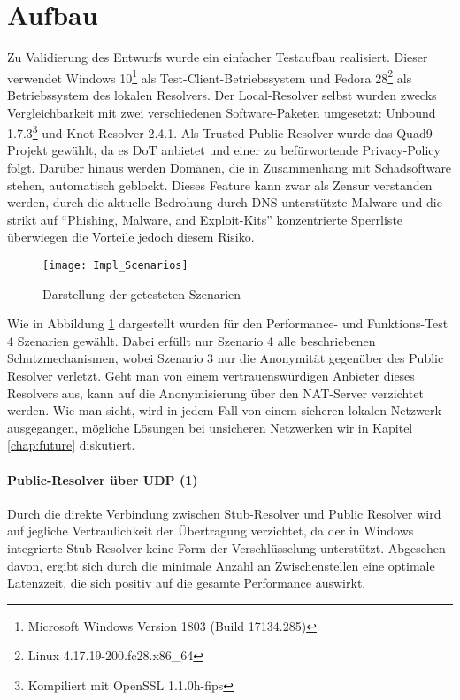 \section{Aufbau}
\label{sec:architecture}
Zu Validierung des Entwurfs wurde ein einfacher Testaufbau realisiert. Dieser verwendet Windows 10\footnote{Microsoft Windows Version 1803 (Build 17134.285)} als Test-Client-Betriebssystem und Fedora 28\footnote{Linux 4.17.19-200.fc28.x86_64} als Betriebssystem des lokalen Resolvers. Der Local-Resolver selbst wurden zwecks Vergleichbarkeit mit zwei verschiedenen Software-Paketen umgesetzt: Unbound 1.7.3\footnote{Kompiliert mit OpenSSL 1.1.0h-fips} und Knot-Resolver 2.4.1. Als Trusted Public Resolver wurde das Quad9-Projekt gewählt, da es DoT anbietet und einer zu befürwortende Privacy-Policy\cite{Quad9Privacy} folgt. Darüber hinaus werden Domänen, die in Zusammenhang mit Schadsoftware stehen, automatisch geblockt. Dieses Feature kann zwar als Zensur verstanden werden, durch die aktuelle Bedrohung durch DNS unterstützte Malware \cite{Alcoy2017} und die strikt auf ``Phishing, Malware, and Exploit-Kits'' konzentrierte Sperrliste\cite{Quad9FAQ} überwiegen die Vorteile jedoch diesem Risiko.   

\begin{figure}[!hb]
    \centering
    \texttt{[image: Impl\_Scenarios]}
    \caption{Darstellung der getesteten Szenarien}
    \label{img:impl-scenarios}
\end{figure}

Wie in Abbildung \ref{img:impl-scenarios} dargestellt wurden für den Performance- und Funktions-Test 4 Szenarien gewählt. Dabei erfüllt nur Szenario 4 alle beschriebenen Schutzmechanismen, wobei Szenario 3 nur die Anonymität gegenüber des Public Resolver verletzt. Geht man von einem vertrauenswürdigen Anbieter dieses Resolvers aus, kann auf die Anonymisierung über den NAT-Server verzichtet werden. Wie man sieht, wird in jedem Fall von einem sicheren lokalen Netzwerk ausgegangen, mögliche Lösungen bei unsicheren Netzwerken wir in Kapitel \ref{chap:future} diskutiert. 

\paragraph{Public-Resolver über UDP (1)}
Durch die direkte Verbindung zwischen Stub-Resolver und Public Resolver wird auf jegliche Vertraulichkeit der Übertragung verzichtet, da der in Windows integrierte Stub-Resolver keine Form der Verschlüsselung unterstützt. Abgesehen davon, ergibt sich durch die minimale Anzahl an Zwischenstellen eine optimale Latenzzeit, die sich positiv auf die gesamte Performance auswirkt.

